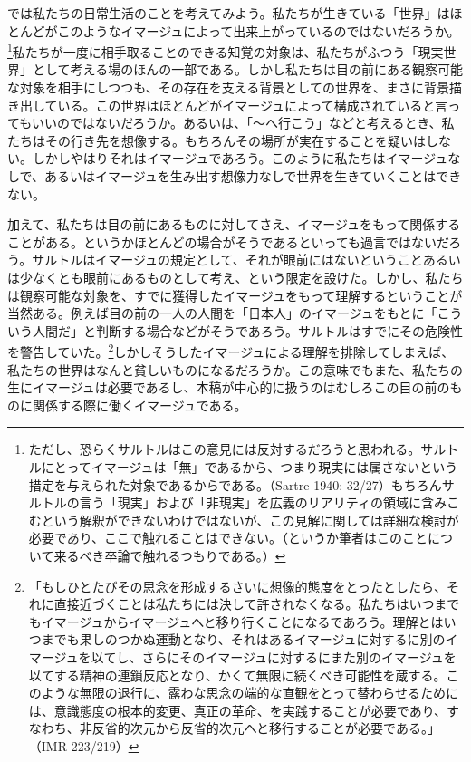 \documentclass[b5j,twoside,twocolumn]{utarticle}
\begin{document}
では私たちの日常生活のことを考えてみよう。私たちが生きている「世界」はほとんどがこのようなイマージュによって出来上がっているのではないだろうか。\footnote{ただし、恐らくサルトルはこの意見には反対するだろうと思われる。サルトルにとってイマージュは「無」であるから、つまり現実には属さないという措定を与えられた対象であるからである。（Sartre 1940: 32/27）もちろんサルトルの言う「現実」および「非現実」を広義のリアリティの領域に含みこむという解釈ができないわけではないが、この見解に関しては詳細な検討が必要であり、ここで触れることはできない。（というか筆者はこのことについて来るべき卒論で触れるつもりである。）}私たちが一度に相手取ることのできる知覚の対象は、私たちがふつう「現実世界」として考える場のほんの一部である。しかし私たちは目の前にある観察可能な対象を相手にしつつも、その存在を支える背景としての世界を、まさに背景描き出している。この世界はほとんどがイマージュによって構成されていると言ってもいいのではないだろうか。あるいは、「～へ行こう」などと考えるとき、私たちはその行き先を想像する。もちろんその場所が実在することを疑いはしない。しかしやはりそれはイマージュであろう。このように私たちはイマージュなしで、あるいはイマージュを生み出す想像力なしで世界を生きていくことはできない。


加えて、私たちは目の前にあるものに対してさえ、イマージュをもって関係することがある。というかほとんどの場合がそうであるといっても過言ではないだろう。サルトルはイマージュの規定として、それが眼前にはないということあるいは少なくとも眼前にあるものとして考え、という限定を設けた。しかし、私たちは観察可能な対象を、すでに獲得したイマージュをもって理解するということが当然ある。例えば目の前の一人の人間を「日本人」のイマージュをもとに「こういう人間だ」と判断する場合などがそうであろう。サルトルはすでにその危険性を警告していた。\footnote{「もしひとたびその思念を形成するさいに想像的態度をとったとしたら、それに直接近づくことは私たちには決して許されなくなる。私たちはいつまでもイマージュからイマージュへと移り行くことになるであろう。理解とはいつまでも果しのつかぬ運動となり、それはあるイマージュに対するに別のイマージュを以てし、さらにそのイマージュに対するにまた別のイマージュを以てする精神の連鎖反応となり、かくて無限に続くべき可能性を蔵する。このような無限の退行に、露わな思念の端的な直観をとって替わらせるためには、意識態度の根本的変更、真正の革命、を実践することが必要であり、すなわち、非反省的次元から反省的次元へと移行することが必要である。」（IMR 223/219）
}しかしそうしたイマージュによる理解を排除してしまえば、私たちの世界はなんと貧しいものになるだろうか。この意味でもまた、私たちの生にイマージュは必要であるし、本稿が中心的に扱うのはむしろこの目の前のものに関係する際に働くイマージュである。
\end{document}

